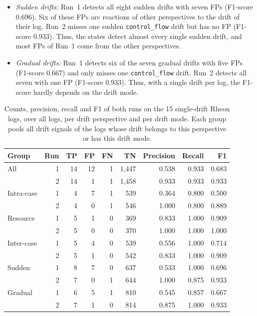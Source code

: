 \begin{itemize}
	\item \emph{Sudden drifts:} \label{sec:eval:rheon:single:sudden} Run~1 detects all eight sudden drifts with seven FPs (F1-score 0.696). Six of these FPs are reactions of other perspectives to the drift of their log. Run~2 misses one sudden \texttt{control\_flow} drift but has no FP (F1-score 0.933). Thus, the states detect almost every single sudden drift, and most FPs of Run~1 come from the other perspectives.
	\item \emph{Gradual drifts:} \label{sec:eval:rheon:single:gradual} Run~1 detects six of the seven gradual drifts with five FPs (F1-score 0.667) and only misses one \texttt{control\_flow} drift. Run~2 detects all seven with one FP (F1-score 0.933). Thus, with a single drift per log, the F1-score hardly depends on the drift mode.
\end{itemize}

\begin{table}[htb]
	\centering
	\caption[Results on the single-drift Rheon logs]{%
		Counts, precision, recall and F1 of both runs on the 15 single-drift Rheon logs, over all logs, per drift perspective and per drift mode. Each group pools all drift signals of the logs whose drift belongs to this perspective or has this drift mode.}
	\label{tab:eval:rheon:single}
	\small
	\begin{tabular}{@{}l|r|r|r|r|r|r|r|r@{}}
		\hline
		Group & Run & TP & FP & FN & TN & Precision & Recall & F1 \\
		\hline
		All & 1 & 14 & 12 & 1 & 1,447 & 0.538 & 0.933 & 0.683 \\
		 & 2 & 14 & 1 & 1 & 1,458 & 0.933 & 0.933 & 0.933 \\
		\hline
		Intra-case & 1 & 4 & 7 & 1 & 539 & 0.364 & 0.800 & 0.500 \\
		 & 2 & 4 & 0 & 1 & 546 & 1.000 & 0.800 & 0.889 \\
		Resource & 1 & 5 & 1 & 0 & 369 & 0.833 & 1.000 & 0.909 \\
		 & 2 & 5 & 0 & 0 & 370 & 1.000 & 1.000 & 1.000 \\
		Inter-case & 1 & 5 & 4 & 0 & 539 & 0.556 & 1.000 & 0.714 \\
		 & 2 & 5 & 1 & 0 & 542 & 0.833 & 1.000 & 0.909 \\
		\hline
		Sudden & 1 & 8 & 7 & 0 & 637 & 0.533 & 1.000 & 0.696 \\
		 & 2 & 7 & 0 & 1 & 644 & 1.000 & 0.875 & 0.933 \\
		Gradual & 1 & 6 & 5 & 1 & 810 & 0.545 & 0.857 & 0.667 \\
		 & 2 & 7 & 1 & 0 & 814 & 0.875 & 1.000 & 0.933 \\
		\hline
	\end{tabular}
\end{table}

